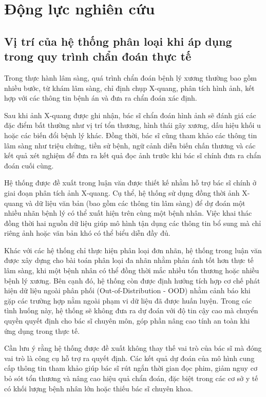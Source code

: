 \section{Động lực nghiên cứu}
\subsection{Vị trí của hệ thống phân loại khi áp dụng trong quy trình chẩn đoán thực tế}

Trong thực hành lâm sàng, quá trình chẩn đoán bệnh lý xương thường bao gồm nhiều bước, 
từ khám lâm sàng, chỉ định chụp X-quang, phân tích hình ảnh, kết hợp với các thông tin bệnh án và đưa ra chẩn đoán xác định. 

Sau khi ảnh X-quang được ghi nhận, bác sĩ chẩn đoán hình ảnh sẽ đánh giá các đặc điểm bất thường như vị trí tổn thương, 
hình thái gãy xương, dấu hiệu khối u hoặc các biến đổi bệnh lý khác. Đồng thời, 
bác sĩ cũng tham khảo các thông tin lâm sàng như triệu chứng, tiền sử bệnh, 
ngữ cảnh diễn biến chấn thương và các kết quả xét nghiệm để đưa ra kết quả đọc ảnh trước khi bác sĩ chính đưa ra chẩn đoán cuối cùng. 

Hệ thống được đề xuất trong luận văn được thiết kế nhằm hỗ trợ bác sĩ chính ở giai đoạn phân tích ảnh X-quang. 
Cụ thể, hệ thống sử dụng đồng thời ảnh X-quang và dữ liệu văn bản (bao gồm các thông tin lâm sàng) 
để dự đoán một nhiều nhãn bệnh lý có thể xuất hiện trên cùng một bệnh nhân. 
Việc khai thác đồng thời hai nguồn dữ liệu giúp mô hình tận dụng các thông tin bổ sung mà chỉ riêng ảnh 
hoặc văn bản khó có thể biểu diễn đầy đủ.

Khác với các hệ thống chỉ thực hiện phân loại đơn nhãn, hệ thống trong luận văn được xây dựng cho bài toán phân loại đa nhãn 
nhằm phản ánh tốt hơn thực tế lâm sàng, khi một bệnh nhân có thể đồng thời mắc nhiều tổn thương hoặc nhiều bệnh lý xương. 
Bên cạnh đó, hệ thống còn được định hướng tích hợp cơ chế phát hiện dữ liệu ngoài phân phối (Out-of-Distribution - OOD) 
nhằm cảnh báo khi gặp các trường hợp nằm ngoài phạm vi dữ liệu đã được huấn luyện. 
Trong các tình huống này, hệ thống sẽ không đưa ra dự đoán với độ tin cậy cao mà chuyển quyền quyết định cho bác sĩ chuyên môn, 
góp phần nâng cao tính an toàn khi ứng dụng trong thực tế.

Cần lưu ý rằng hệ thống được đề xuất không thay thế vai trò của bác sĩ mà đóng vai trò là công cụ hỗ trợ ra quyết định. 
Các kết quả dự đoán của mô hình cung cấp thông tin tham khảo giúp bác sĩ 
rút ngắn thời gian đọc phim, giảm nguy cơ bỏ sót tổn thương và nâng cao hiệu quả chẩn đoán, 
đặc biệt trong các cơ sở y tế có khối lượng bệnh nhân lớn hoặc thiếu bác sĩ chuyên khoa.


